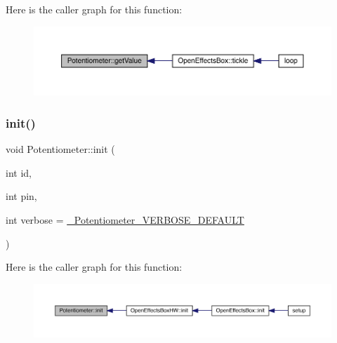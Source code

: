 Here is the caller graph for this function\+:\nopagebreak
\begin{figure}[H]
\begin{center}
\leavevmode
\includegraphics[width=350pt]{class_potentiometer_a88c44aecdfce24a5dd0e719b94267dc6_icgraph}
\end{center}
\end{figure}
\mbox{\label{class_potentiometer_ab1c2e1513f98952487482eb48406f1bb}} 
\subsubsection{\texorpdfstring{init()}{init()}}
{\footnotesize\ttfamily void Potentiometer\+::init (\begin{DoxyParamCaption}\item[{int}]{id,  }\item[{int}]{pin,  }\item[{int}]{verbose = {\ttfamily \mbox{\hyperlink{_potentiometer_8h_ada534779e17a276eadfea81c53d6bd03}{\+\_\+\+Potentiometer\+\_\+\+V\+E\+R\+B\+O\+S\+E\+\_\+\+D\+E\+F\+A\+U\+LT}}} }\end{DoxyParamCaption})}

Here is the caller graph for this function\+:\nopagebreak
\begin{figure}[H]
\begin{center}
\leavevmode
\includegraphics[width=350pt]{class_potentiometer_ab1c2e1513f98952487482eb48406f1bb_icgraph}
\end{center}
\end{figure}
\mbox{\label{class_potentiometer_a56e36ed55abee08cbe81ce01687f82ad}} 
